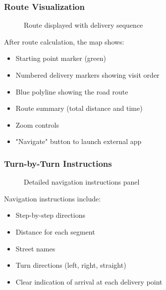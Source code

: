\documentclass[12pt,a4paper]{article}
\begin{document}
\subsubsection{Route Visualization}

\begin{figure}[h]
    \centering
    \caption{Route displayed with delivery sequence}
\end{figure}

After route calculation, the map shows:
\begin{itemize}
    \item Starting point marker (green)
    \item Numbered delivery markers showing visit order
    \item Blue polyline showing the road route
    \item Route summary (total distance and time)
    \item Zoom controls
    \item "Navigate" button to launch external app
\end{itemize}

\subsubsection{Turn-by-Turn Instructions}

\begin{figure}[h]
    \centering
    \caption{Detailed navigation instructions panel}
\end{figure}

Navigation instructions include:
\begin{itemize}
    \item Step-by-step directions
    \item Distance for each segment
    \item Street names
    \item Turn directions (left, right, straight)
    \item Clear indication of arrival at each delivery point
\end{itemize}
\end{document}
